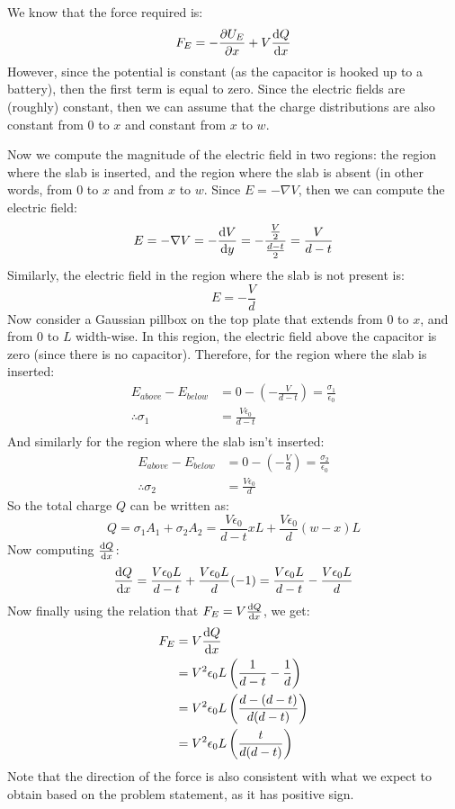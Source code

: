 \documentclass[10pt]{article}
\begin{document}
	\begin{solution}
			We know that the force required is: \[
					F_E = -\pdv{U_E}{x} + V \dv{Q}{x}
			\] However, since the potential is constant (as the capacitor is hooked up to a battery), then the 
			first term is equal to zero. Since the electric fields are (roughly) constant, then we can assume
			that the charge distributions are also constant from 0 to $x$ and constant from $x$ to $w$. 

			Now we compute the magnitude of the electric field in two regions: the region where the slab is 
			inserted, and the region where the slab is absent (in other words, from 0 to $x$ and from $x$ to $w$.
			Since $E = -\nabla V$, then we can compute the electric field:
			\[
				 E = -\nabla V = -\dv{V}{y} = -\frac{\frac{V}{2}}{\frac{d-t}{2}} = \frac{V}{d-t}
			\] 
			Similarly, the electric field in the region where the slab is not present is:
			\[
			E = -\frac{V}{d}
			\] 
			Now consider a Gaussian pillbox on the top plate that extends from 0 to $x$, and from $0$ to $L$ 
			width-wise. In this region, the electric field above the capacitor is zero (since there is no 
			capacitor). Therefore, for the region where the slab is inserted: 
			\begin{align*}
					E_{above} - E_{below} &= 0 - \left( -\frac{V}{d-t} \right) = \frac{\sigma_1}{\epsilon_0} \\
					\therefore \sigma_1&= \frac{V\epsilon_0}{d-t} \\
			\end{align*}
			And similarly for the region where the slab isn't inserted:
			\begin{align*}
					E_{above} - E_{below} &= 0 - \left( -\frac{V}{d} \right) = \frac{\sigma_2}{\epsilon_0} \\
					\therefore \sigma_2 &= \frac{V \epsilon_0}{d}
			\end{align*}
			So the total charge $Q$ can be written as:
			\[
			Q = \sigma_1A_1+\sigma_2A_2 = \frac{V\epsilon_0}{d-t}xL + \frac{V\epsilon_0}{d}(w-x)L
			\] 
			Now computing $\dv{Q}{x}$:
			\[
					\dv{Q}{x} = \frac{V\epsilon_0L}{d-t} + \frac{V\epsilon_0L}{d}(-1) = \frac{V\epsilon_0L}{d-t}
					- \frac{V\epsilon_0L}{d}
			\] 
			Now finally using the relation that $F_E = V\dv{Q}{x}$, we get:
			\begin{align*}
					F_E &= V \dv{Q}{x}\\
					&= V^2\epsilon_0L\left( \frac{1}{d-t}- \frac{1}{d} \right)  \\
					&= V^2\epsilon_0L\left( \frac{d - (d-t)}{d(d-t)} \right)  \\
					&= V^2\epsilon_0L\left( \frac{t}{d(d-t)} \right)
			\end{align*}
			Note that the direction of the force is also consistent with what we expect to obtain based on the 
			problem statement, as it has positive sign. 
	\end{solution}
	
\end{document}
